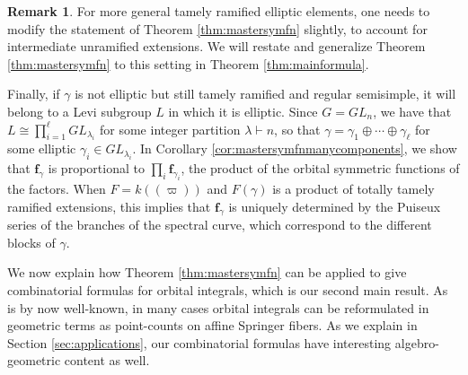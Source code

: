 \documentclass{amsart}
\numberwithin{equation}{section}
\theoremstyle{definition}
\newtheorem{example}[lemma]{Example}%
\newtheorem{remark}[lemma]{Remark}%
\newcommand{\fgamma}{\mathbf{f}_{\gamma}}
\DeclareMathOperator{\cchar}{\text{char}}
\begin{document}
\begin{remark}\label{rmk:RedtoLeviIntro}
For more general tamely ramified elliptic elements, one needs to modify the statement of Theorem \ref{thm:mastersymfn} slightly, to account for intermediate unramified extensions. We will restate and generalize Theorem \ref{thm:mastersymfn} to this setting in Theorem \ref{thm:mainformula}.

Finally, if $\gamma$ is not elliptic but still tamely ramified and regular semisimple, it will belong to a Levi subgroup $L$ in which it is elliptic. 
Since $G=GL_n$, we have that $L\cong \prod_{i=1}^\ell GL_{\lambda_i}$ for some integer partition $\lambda\vdash n$, so that 
$\gamma=\gamma_1\oplus\cdots \oplus \gamma_\ell$ for some elliptic $\gamma_i\in GL_{\lambda_i}$. In Corollary \ref{cor:mastersymfnmanycomponents}, we show that $\fgamma$ is proportional to $\prod_i \mathbf{f}_{\gamma_i}$, the product of the orbital symmetric functions of the factors. When $F=k((\varpi))$ and $F(\gamma)$ is a product of totally tamely ramified extensions, this implies that $\fgamma$ is uniquely determined by the Puiseux series of the branches of the spectral curve, which correspond to the different blocks of $\gamma$. 
\end{remark}


We now explain how Theorem \ref{thm:mastersymfn} can be applied to give combinatorial formulas for orbital integrals, which is our second main result. As is by now well-known, in many cases orbital integrals can be reformulated in geometric terms as point-counts on affine Springer fibers. As we explain in Section \ref{sec:applications}, our combinatorial formulas have interesting algebro-geometric content as well.
\end{document}
